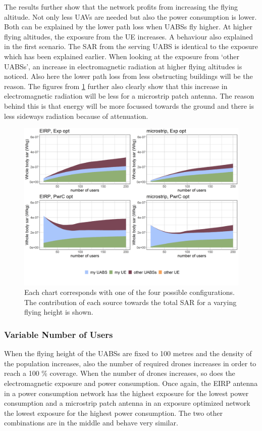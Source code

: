 \documentclass[twocolumn]{phdsymp} %
\begin{document}
The results further show that the network profits from increasing the flying altitude. Not only
less \gls{UAV}s are needed but also the power consumption is lower. Both can be explained by the
lower path loss when UABSs fly higher. At higher flying altitudes, 
the exposure from the \gls{UE} increases. A behaviour also explained in the first scenario.
The SAR from the serving \gls{UABS} is identical to the exposure which has been explained earlier.
When looking at the exposure from `other \gls{UABS}s', an increase in electromagnetic radiation at higher 
flying altitudes is noticed.
Also here the lower path loss from less obstructing buildings will be the reason.
The figures from \ref{fig:s3a_fourSourcesMatrix} further also clearly show that this increase 
in electromagnetic radiation will be less for a microstrip patch antenna. The reason behind this is that energy 
will be more focussed towards the ground and there is less sideways radiation because of attenuation.

\begin{figure}[h!]
  \includegraphics[width=\linewidth]{../results/s3/fhFourSources.png}
  \caption{Each chart corresponds with one of the four possible configurations. The contribution of each source towards the total 
  \gls{SAR} for a varying flying height is shown.}
  \label{fig:s3a_fourSourcesMatrix}
\end{figure}

\subsubsection{Variable Number of Users}
When the flying height of the \gls{UABS}s are fixed to 100 metres and the density of the population increases, also 
the number of required drones increases in order to reach a 100 \% coverage. When the number of drones increases, 
so does the electromagnetic exposure and power consumption.
Once again, the EIRP antenna in a power consumption network has the highest exposure for the lowest power consumption
and a microstrip patch antenna in an exposure optimized network the lowest exposure for the highest power consumption.
The two other combinations are in the middle and behave very similar.
\end{document}
